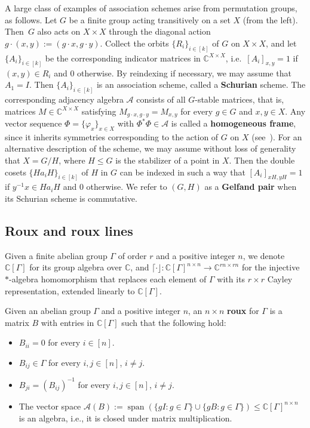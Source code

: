 A large class of examples of association schemes arise from permutation groups, as follows.
Let $G$ be a finite group acting transitively on a set $X$ (from the left).
Then~$G$ also acts on $X \times X$ through the diagonal action $g\cdot (x,y) := (g\cdot x, g\cdot y)$.
Collect the orbits $\{ R_i \}_{i \in [k]}$ of $G$ on $X \times X$, and let $\{ A_i \}_{i \in [k]}$ be the corresponding indicator matrices in $\mathbb{C}^{X \times X}$, i.e.\ $[A_i]_{x,y} = 1$ if $(x,y) \in R_i$ and $0$ otherwise.
By reindexing if necessary, we may assume that $A_1 = I$.
Then $\{ A_i \}_{i\in [k]}$ is an association scheme, called a \textbf{Schurian} scheme.
The corresponding adjacency algebra $\mathscr{A}$ consists of all $G$-stable matrices, that is, matrices $M \in \mathbb{C}^{X\times X}$ satisfying $M_{g\cdot x, g\cdot y} = M_{x,y}$ for every $g \in G$ and $x,y \in X$.
Any vector sequence $\Phi = \{ \varphi_x \}_{x \in X}$ with $\Phi^* \Phi \in \mathscr{A}$ is called a \textbf{homogeneous frame}, since it inherits symmetries corresponding to the action of $G$ on $X$ (see~\cite{IversonJM:17}).
For an alternative description of the scheme, we may assume without loss of generality that $X = G/H$, where $H \leq G$ is the stabilizer of a point in $X$.
Then the double cosets $\{ H a_i H \}_{i \in [k]}$ of $H$ in $G$ can be indexed in such a way that $[A_i]_{xH,yH} = 1$ if $y^{-1}x \in Ha_i H$ and $0$ otherwise.
We refer to $(G,H)$ as a \textbf{Gelfand pair} when its Schurian scheme is commutative.


\subsection{Roux and roux lines}

Given a finite abelian group $\Gamma$ of order $r$ and a positive integer $n$, we denote $\mathbb{C}[\Gamma]$ for its group algebra over $\mathbb{C}$, and $\lceil \cdot \rfloor \colon \mathbb{C}[\Gamma]^{n\times n} \to \mathbb{C}^{rn \times rn}$ for the injective $\ast$-algebra homomorphism that replaces each element of $\Gamma$ with its $r\times r$ Cayley representation, extended linearly to $\mathbb{C}[\Gamma]$.

\begin{definition}
Given an abelian group $\Gamma$ and a positive integer $n$, an $n\times n$ \textbf{roux} for $\Gamma$ is a matrix $B$ with entries in $\mathbb{C}[\Gamma]$ such that the following hold:
\begin{itemize}
\item[(R1)]
$B_{ii}=0$ for every $i\in[n]$.
\item[(R2)]
$B_{ij}\in\Gamma$ for every $i,j\in[n]$, $i\neq j$.
\item[(R3)]
$B_{ji}=(B_{ij})^{-1}$ for every $i,j\in[n]$, $i\neq j$.
\item[(R4)]
The vector space $\mathscr{A}(B) := \operatorname{span} (\{ gI : g \in \Gamma\} \cup \{ gB : g \in \Gamma \}) \leq \mathbb{C}[\Gamma]^{n\times n}$ is an algebra, i.e., it is closed under matrix multiplication.
\end{itemize}
\end{definition}

